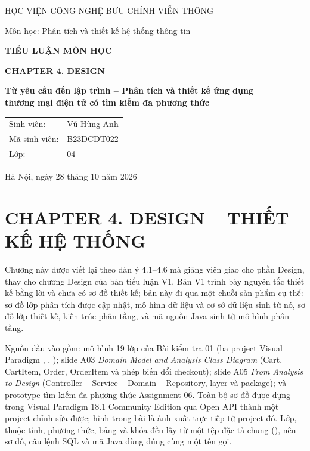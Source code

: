 \documentclass[12pt,a4paper]{article}
\begin{document}
\begin{titlepage}
\centering
{\large HỌC VIỆN CÔNG NGHỆ BƯU CHÍNH VIỄN THÔNG\par}
\vspace{0.8cm}
{\large Môn học: Phân tích và thiết kế hệ thống thông tin\par}
\vspace{2.4cm}
{\Large\bfseries TIỂU LUẬN MÔN HỌC\par}
\vspace{0.5cm}
{\Huge\bfseries\color{ptitred} CHAPTER 4. DESIGN\par}
\vspace{0.9cm}
{\large\bfseries Từ yêu cầu đến lập trình -- Phân tích và thiết kế ứng dụng\\
thương mại điện tử có tìm kiếm đa phương thức\par}
\vspace{2.4cm}
\begin{tabular}{ll}
Sinh viên: & Vũ Hùng Anh\\[0.35cm]
Mã sinh viên: & B23DCDT022\\[0.35cm]
Lớp: & 04
\end{tabular}
\vfill
{\large Hà Nội, ngày 28 tháng 10 năm 2026\par}
\end{titlepage}

{\small\setlength{\parskip}{0pt}\tableofcontents}
\clearpage

\section*{CHAPTER 4. DESIGN -- THIẾT KẾ HỆ THỐNG}

Chương này được viết lại theo dàn ý 4.1--4.6 mà giảng viên giao cho phần Design, thay cho chương
Design của bản tiểu luận V1. Bản V1 trình bày nguyên tắc thiết kế bằng lời và chưa có sơ đồ thiết kế;
bản này đi qua một chuỗi sản phẩm cụ thể: sơ đồ lớp phân tích được cập nhật, mô hình dữ liệu và cơ sở
dữ liệu sinh từ nó, sơ đồ lớp thiết kế, kiến trúc phân tầng, và mã nguồn Java sinh từ mô hình phân tầng.

Nguồn đầu vào gồm: mô hình 19 lớp của Bài kiểm tra 01 (ba project Visual Paradigm
, , ); slide A03 \emph{Domain Model and
Analysis Class Diagram} (Cart, CartItem, Order, OrderItem và phép biến đổi checkout); slide A05
\emph{From Analysis to Design} (Controller -- Service -- Domain -- Repository, layer và package);
và prototype tìm kiếm đa phương thức Assignment 06. Toàn bộ sơ đồ được dựng trong Visual Paradigm 18.1
Community Edition qua Open API thành một project chỉnh sửa được; hình trong bài là ảnh xuất trực tiếp
từ project đó. Lớp, thuộc tính, phương thức, bảng và khóa đều lấy từ một tệp đặc tả chung
(), nên sơ đồ, câu lệnh SQL và mã Java dùng đúng cùng một tên gọi.
\end{document}
